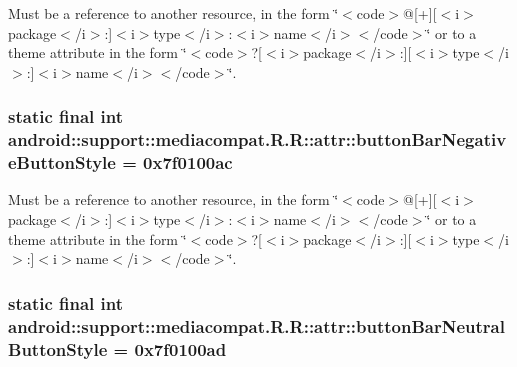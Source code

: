 Must be a reference to another resource, in the form \char`\"{}$<$code$>$@\mbox{[}+\mbox{]}\mbox{[}$<$i$>$package$<$/i$>$:\mbox{]}$<$i$>$type$<$/i$>$:$<$i$>$name$<$/i$>$$<$/code$>$\char`\"{} or to a theme attribute in the form \char`\"{}$<$code$>$?\mbox{[}$<$i$>$package$<$/i$>$:\mbox{]}\mbox{[}$<$i$>$type$<$/i$>$:\mbox{]}$<$i$>$name$<$/i$>$$<$/code$>$\char`\"{}. \hypertarget{classandroid_1_1support_1_1mediacompat_1_1_r_1_1attr_481a8d52c382f9ca3a00ef96841d6efb}{
\subsubsection[{buttonBarNegativeButtonStyle}]{\setlength{\rightskip}{0pt plus 5cm}static final int android::support::mediacompat.R.R::attr::buttonBarNegativeButtonStyle = 0x7f0100ac}}
\label{classandroid_1_1support_1_1mediacompat_1_1_r_1_1attr_481a8d52c382f9ca3a00ef96841d6efb}


Must be a reference to another resource, in the form \char`\"{}$<$code$>$@\mbox{[}+\mbox{]}\mbox{[}$<$i$>$package$<$/i$>$:\mbox{]}$<$i$>$type$<$/i$>$:$<$i$>$name$<$/i$>$$<$/code$>$\char`\"{} or to a theme attribute in the form \char`\"{}$<$code$>$?\mbox{[}$<$i$>$package$<$/i$>$:\mbox{]}\mbox{[}$<$i$>$type$<$/i$>$:\mbox{]}$<$i$>$name$<$/i$>$$<$/code$>$\char`\"{}. \hypertarget{classandroid_1_1support_1_1mediacompat_1_1_r_1_1attr_ae8ac0674840b4061205ca256ed71223}{
\subsubsection[{buttonBarNeutralButtonStyle}]{\setlength{\rightskip}{0pt plus 5cm}static final int android::support::mediacompat.R.R::attr::buttonBarNeutralButtonStyle = 0x7f0100ad}}
\label{classandroid_1_1support_1_1mediacompat_1_1_r_1_1attr_ae8ac0674840b4061205ca256ed71223}


